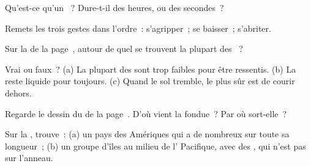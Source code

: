 \begin{exercise}[$\star$]\label{exo:g4:volcanoes-earthquakes-first-look:2}
Qu'est-ce qu'un ~? Dure-t-il des heures, ou des secondes~?
\end{exercise}

\begin{exercise}[$\star$]\label{exo:g4:volcanoes-earthquakes-first-look:3}
Remets les trois gestes dans l'ordre~: s'agripper~; se baisser~; s'abriter.
\end{exercise}

\begin{exercise}[$\star$]\label{exo:g4:volcanoes-earthquakes-first-look:4}
Sur la  de la page~\pageref{fig:g4:volcanoes-earthquakes-first-look:map},
autour de quel  se trouvent la plupart des ~?
\end{exercise}

\begin{exercise}[$\star$]\label{exo:g4:volcanoes-earthquakes-first-look:5}
Vrai ou faux~? (a) La plupart des  sont trop faibles pour être
ressentis. (b) La  reste liquide pour toujours. (c) Quand le sol
tremble, le plus sûr est de courir dehors.
\end{exercise}

\begin{exercise}[$\star$]\label{exo:g4:volcanoes-earthquakes-first-look:6}
Regarde le dessin du  de la page~\pageref{fig:g4:volcanoes-earthquakes-first-look:volcano}.
D'où vient la  fondue~? Par où sort-elle~?
\end{exercise}

\begin{exercise}[$\star\star$]\label{exo:g4:volcanoes-earthquakes-first-look:7}
Sur la , trouve~: (a) un pays des Amériques qui a de nombreux 
sur toute sa longueur~; (b) un groupe d'îles au milieu de l'
Pacifique, avec des , qui n'est pas sur l'anneau.
\end{exercise}

